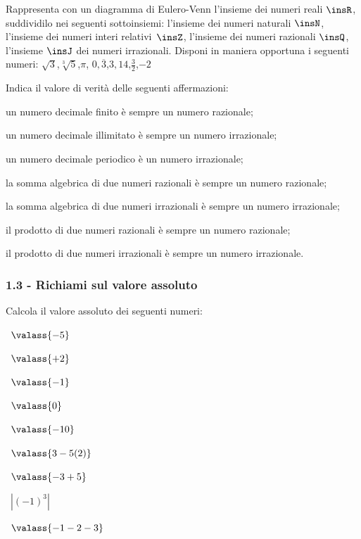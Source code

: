 \begin{esercizio}
\label{ese:1.6}
 Rappresenta con un diagramma di Eulero-Venn l'insieme dei numeri reali 
$\insR$, suddividilo nei seguenti sottoinsiemi: l'insieme dei numeri naturali 
$\insN$, l'insieme dei numeri interi relativi~$\insZ$, l'insieme dei numeri 
razionali $\insQ$, l'insieme $\insJ$ dei numeri irrazionali. Disponi in maniera 
opportuna i seguenti numeri: $\sqrt 3$,\quad $\sqrt[3]5$,\quad$\pi$,\quad 
$0,\overline 3$,\quad $3,14$,\quad $\frac 3 2$,\quad$-2$
\end{esercizio}

\begin{esercizio}
\label{ese:1.7}
Indica il valore di verità delle seguenti affermazioni:
\begin{enumeratea}
\item un numero decimale finito è sempre un numero razionale;
\item un numero decimale illimitato è sempre un numero irrazionale;
\item un numero decimale periodico è un numero irrazionale;
\item la somma algebrica di due numeri razionali è sempre un numero razionale;
\item la somma algebrica di due numeri irrazionali è sempre un numero 
irrazionale;
\item il prodotto di due numeri razionali è sempre un numero razionale;
\item il prodotto di due numeri irrazionali è sempre un numero irrazionale.
\end{enumeratea}
\end{esercizio}

\subsubsection*{1.3 - Richiami sul valore assoluto}
\begin{esercizio}
\label{ese:1.8}
 Calcola il valore assoluto dei seguenti numeri:
\begin{multicols}{3}
 \begin{enumeratea}
 \item~$\valass{-5}$
 \item~$\valass{+2}$
 \item~$\valass{-1}$
 \item~$\valass{0}$
 \item~$\valass{-10}$
 \item~$\valass{3-5(2)}$
 \item~$\valass{-3+5}$
 \item~$\left|{(-1)^3}\right|$
 \item~$\valass{-1-2-3}$
 \end{enumeratea}
 \end{multicols}
\end{esercizio}

